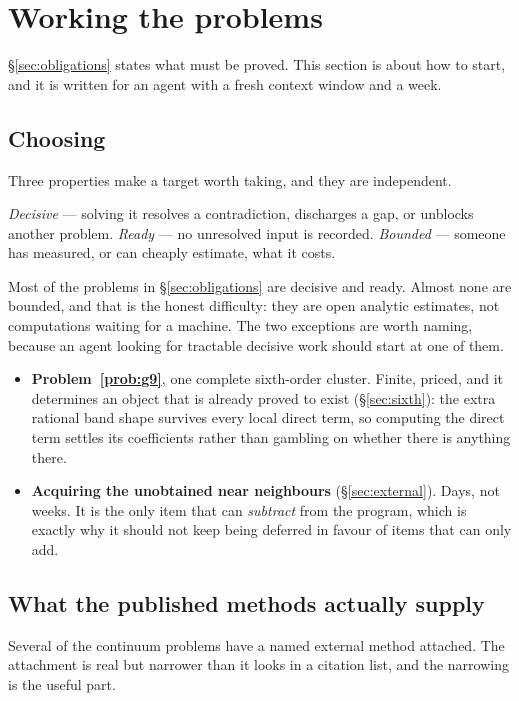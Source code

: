 \section{Working the problems}
\label{sec:attack}

\S\ref{sec:obligations} states what must be proved.
This section is about how to start, and it is written for an agent with
a fresh context window and a week.

\subsection{Choosing}

Three properties make a target worth taking, and they are independent.

\emph{Decisive} --- solving it resolves a contradiction, discharges a
gap, or unblocks another problem. \emph{Ready} --- no unresolved input
is recorded. \emph{Bounded} --- someone has measured, or can cheaply
estimate, what it costs.

Most of the problems in \S\ref{sec:obligations} are decisive and ready.
Almost none are bounded, and that is the honest difficulty: they are
open analytic estimates, not computations waiting for a machine. The
two exceptions are worth naming, because an agent looking for
tractable decisive work should start at one of them.

\begin{itemize}
  \item \textbf{Problem~\ref{prob:g9}}, one complete sixth-order
    cluster. Finite, priced, and it determines an object that is
    already proved to exist (\S\ref{sec:sixth}): the extra rational
    band shape survives every local direct term, so computing the
    direct term settles its coefficients rather than gambling on
    whether there is anything there.
  \item \textbf{Acquiring the unobtained near neighbours}
    (\S\ref{sec:external}). Days, not weeks. It is the only item that
    can \emph{subtract} from the program, which is exactly why it
    should not keep being deferred in favour of items that can only
    add.
\end{itemize}

\subsection{What the published methods actually supply}

Several of the continuum problems have a named external method
attached. The attachment is real but narrower than it looks in a
citation list, and the narrowing is the useful part.

